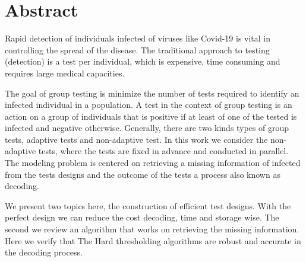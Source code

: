 \chapter*{Abstract}
%
%



Rapid detection of individuals infected of viruses like Covid-19 is vital in controlling the spread of the disease. The traditional approach to testing (detection) is a test per individual, which is expensive, time consuming and requires large medical capacities.  

The goal of group testing is minimize the number of tests required to identify an infected individual in a population. A test in the context of group testing is an action on a group of individuals that is positive if at least of one of the tested is infected and negative otherwise. Generally, there are two kinds types of group tests, adaptive tests and non-adaptive test. In this work we consider the non-adaptive tests, where the tests are fixed in advance and conducted in parallel. The modeling problem is centered on retrieving a missing information of infected from the tests designs and the outcome of the tests a process also known as decoding.    


We present two topics here, the construction of efficient test designs. With the perfect design we can reduce the cost decoding, time and storage wise.  The second we review an algorithm that works on retrieving the missing information.  Here we verify that The Hard thresholding algorithms are robust and accurate in the decoding process.  